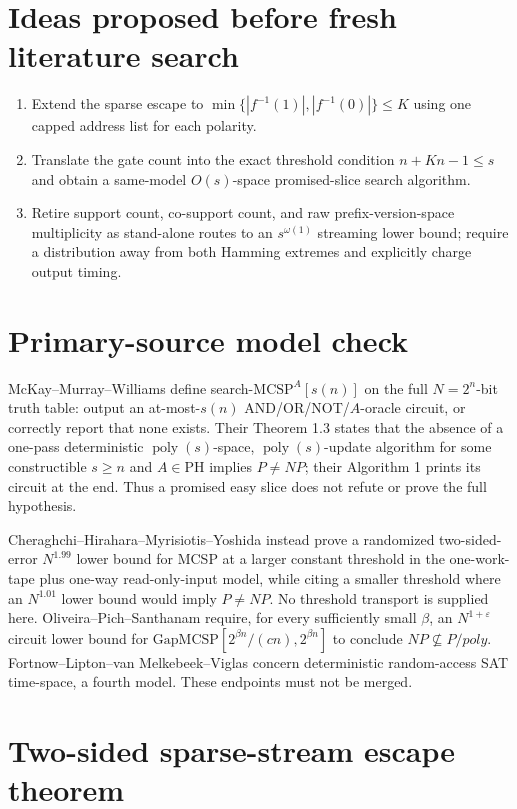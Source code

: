 \documentclass[11pt]{article}
\begin{document}
\section*{Ideas proposed before fresh literature search}
\begin{enumerate}
\item Extend the sparse escape to
$\min\{|f^{-1}(1)|,|f^{-1}(0)|\}\le K$ using one capped address list for
each polarity.
\item Translate the gate count into the exact threshold condition
$n+Kn-1\le s$ and obtain a same-model $O(s)$-space promised-slice search
algorithm.
\item Retire support count, co-support count, and raw prefix-version-space
multiplicity as stand-alone routes to an $s^{\omega(1)}$ streaming lower
bound; require a distribution away from both Hamming extremes and explicitly
charge output timing.
\end{enumerate}

\section*{Primary-source model check}
McKay--Murray--Williams define search-$\mathrm{MCSP}^A[s(n)]$ on the full
$N=2^n$-bit truth table: output an at-most-$s(n)$ AND/OR/NOT/$A$-oracle
circuit, or correctly report that none exists.  Their Theorem 1.3 states that
the absence of a one-pass deterministic $\operatorname{poly}(s)$-space,
$\operatorname{poly}(s)$-update algorithm for some constructible $s\ge n$
and $A\in\mathrm{PH}$ implies $P\ne NP$; their Algorithm 1 prints its circuit
at the end.  Thus a promised easy slice does not refute or prove the full
hypothesis.

Cheraghchi--Hirahara--Myrisiotis--Yoshida instead prove a randomized
two-sided-error $N^{1.99}$ lower bound for MCSP at a larger constant threshold
in the one-work-tape plus one-way read-only-input model, while citing a smaller
threshold where an $N^{1.01}$ lower bound would imply $P\ne NP$.  No threshold
transport is supplied here.  Oliveira--Pich--Santhanam require, for every
sufficiently small $\beta$, an $N^{1+\varepsilon}$ circuit lower bound for
$\mathrm{GapMCSP}[2^{\beta n}/(cn),2^{\beta n}]$ to conclude
$NP\nsubseteq P/poly$.  Fortnow--Lipton--van Melkebeek--Viglas concern
deterministic random-access SAT time-space, a fourth model.  These endpoints
must not be merged.

\section*{Two-sided sparse-stream escape theorem}
\end{document}
